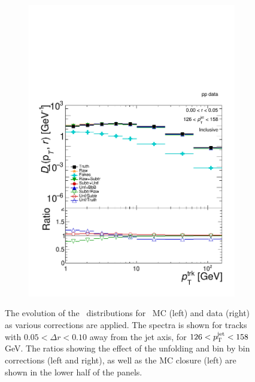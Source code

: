\begin{figure}
\begin{subfigure}{0.5\textwidth}
\centering \includegraphics[page=5, width=1\textwidth]{figures/main/corrections/evol_pp_data.pdf}
\caption{}
\end{subfigure}
\caption{The evolution of the \Dptr\ distributions for \pp\ MC (left) and data (right) as various corrections are applied.
The spectra is shown for tracks with $0.05 < \Delta r < 0.10$ away from the jet axis, for $126 < \mbox{$p_{\mathrm{T}}^{\mathrm{jet}}$} < 158$ GeV.
The ratios showing the effect of the unfolding and bin by bin corrections (left and right), as well as the MC closure (left) are shown in the lower half of the panels.}
\label{fig:evol_pp}
\end{figure}


